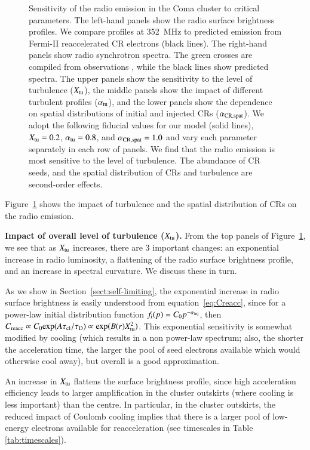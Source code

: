 \documentclass[fleqn,usenatbib,useAMS]{mnras}
\begin{document}
\begin{figure}
\caption{Sensitivity of the radio emission in the Coma cluster to
  critical parameters. The left-hand panels show the radio surface
  brightness profiles. We compare profiles at 352~MHz \citep[blue
    crosses,][]{brown11} to predicted emission from Fermi-II
  reaccelerated CR electrons (black lines). The right-hand panels show
  radio synchrotron spectra. The green crosses are compiled from
  observations \citep{2010PhDT.......259P}, while the black lines show
  predicted spectra. The upper panels show the sensitivity to the
  level of turbulence ($X_{\mathrm{tu}}$), the middle panels show the
  impact of different turbulent profiles ($\alpha_{\mathrm{tu}}$), and the
  lower panels show the dependence on spatial distributions of initial
  and injected CRs ($\alpha_{\mathrm{CR,spat}}$). We adopt the following
  fiducial values for our model (solid lines), $X_{\mathrm{tu}}=0.2$,
  $\alpha_{\mathrm{tu}}=0.8$, and $\alpha_{\mathrm{CR,spat}}=1.0$ and vary each
  parameter separately in each row of panels. We find that the radio
  emission is most sensitive to the level of turbulence. The abundance
  of CR seeds, and the spatial distribution of CRs and turbulence are
  second-order effects.}
  \label{fig:param_comp}
\end{figure}

Figure~\ref{fig:param_comp} shows the impact of turbulence and the
spatial distribution of CRs on the radio emission. 

{\bf Impact of overall level of turbulence ($X_{\rm tu}$).} From the top panels of Figure~\ref{fig:param_comp}, we see that as $X_{\rm tu}$ increases, there are 3 important changes: an exponential increase in radio luminosity, a flattening of the radio surface brightness profile, and an increase in spectral curvature. We discuss these in turn. 

As we show in Section~\ref{sect:self-limiting}, the exponential increase in radio surface brightness is easily understood from equation~\ref{eq:Creacc}, since for a power-law initial distribution function $f_{\rm i}(p) = C_{\rm 0} p^{-\alpha_{{\mathrm{inj}}}}$, then $C_{\rm reacc} \propto C_{\rm 0} {\rm exp}(A \tau_{\rm cl}/\tau_{\rm D}) \propto {\rm exp} (B(r) X_{\rm tu}^{2})$. This exponential sensitivity is somewhat modified by cooling (which results in a non power-law spectrum; also, the shorter the acceleration time, the larger the pool of seed electrons available which would otherwise cool away), but overall is a good approximation.  

An increase in $X_{\rm tu}$ flattens the surface brightness profile, since high acceleration efficiency leads to larger amplification in the cluster outskirts (where cooling is less important) than the centre. In particular, in the cluster outskirts, the reduced impact of Coulomb cooling implies that there is a larger pool of low-energy electrons available for reacceleration (see timescales in Table \ref{tab:timescales}). 
\end{document}
